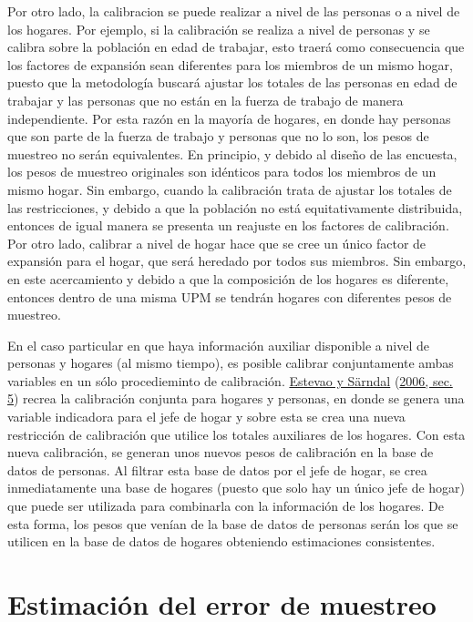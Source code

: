 \documentclass[
  12pt,
  spanish,
]{book}
\begin{document}
Por otro lado, la calibracion se puede realizar a nivel de las personas o a nivel de los hogares. Por ejemplo, si la calibración se realiza a nivel de personas y se calibra sobre la población en edad de trabajar, esto traerá como consecuencia que los factores de expansión sean diferentes para los miembros de un mismo hogar, puesto que la metodología buscará ajustar los totales de las personas en edad de trabajar y las personas que no están en la fuerza de trabajo de manera independiente. Por esta razón en la mayoría de hogares, en donde hay personas que son parte de la fuerza de trabajo y personas que no lo son, los pesos de muestreo no serán equivalentes. En principio, y debido al diseño de las encuesta, los pesos de muestreo originales son idénticos para todos los miembros de un mismo hogar. Sin embargo, cuando la calibración trata de ajustar los totales de las restricciones, y debido a que la población no está equitativamente distribuida, entonces de igual manera se presenta un reajuste en los factores de calibración. Por otro lado, calibrar a nivel de hogar hace que se cree un único factor de expansión para el hogar, que será heredado por todos sus miembros. Sin embargo, en este acercamiento y debido a que la composición de los hogares es diferente, entonces dentro de una misma UPM se tendrán hogares con diferentes pesos de muestreo.

En el caso particular en que haya información auxiliar disponible a nivel de personas y hogares (al mismo tiempo), es posible calibrar conjuntamente ambas variables en un sólo procedieminto de calibración. \protect\hyperlink{ref-Estevao_Sarndal_2006}{Estevao y Särndal} (\protect\hyperlink{ref-Estevao_Sarndal_2006}{2006, sec. 5}) recrea la calibración conjunta para hogares y personas, en donde se genera una variable indicadora para el jefe de hogar y sobre esta se crea una nueva restricción de calibración que utilice los totales auxiliares de los hogares. Con esta nueva calibración, se generan unos nuevos pesos de calibración en la base de datos de personas. Al filtrar esta base de datos por el jefe de hogar, se crea inmediatamente una base de hogares (puesto que solo hay un único jefe de hogar) que puede ser utilizada para combinarla con la información de los hogares. De esta forma, los pesos que venían de la base de datos de personas serán los que se utilicen en la base de datos de hogares obteniendo estimaciones consistentes.

\hypertarget{estimaciuxf3n-del-error-de-muestreo}{%
\chapter{Estimación del error de muestreo}\label{estimaciuxf3n-del-error-de-muestreo}}
\end{document}

